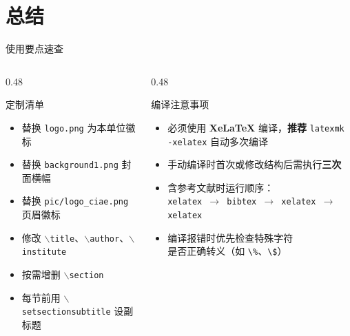 \documentclass[aspectratio=169]{beamer}
\def\cmd#1{\texttt{\color{red}\footnotesize $\backslash$#1}}
\begin{document}
\section{总结}

\begin{frame}{使用要点速查}
\begin{columns}[T]
\begin{column}{0.48\textwidth}
\begin{aim*}{定制清单}{}
\begin{itemize}[left=0pt,label=\textcolor{deepblue}{}]
    \item 替换 \texttt{logo.png} 为本单位徽标
    \item 替换 \texttt{background1.png} 封面横幅
    \item 替换 \texttt{pic/logo\_ciae.png} 页眉徽标
    \item 修改 \cmd{title}、\cmd{author}、\cmd{institute}
    \item 按需增删 \cmd{section}
    \item 每节前用 \cmd{setsectionsubtitle} 设副标题
\end{itemize}
\end{aim*}
\end{column}
\begin{column}{0.48\textwidth}
\begin{aim*}{编译注意事项}{}
\begin{itemize}[left=0pt,label=\textcolor{deepblue}{}]
    \item 必须使用 \textbf{XeLaTeX} 编译，\textbf{推荐} \texttt{latexmk -xelatex} 自动多次编译
    \item 手动编译时首次或修改结构后需执行\textbf{三次}
    \item 含参考文献时运行顺序：\\[0.3em]
    {\small\texttt{xelatex $\to$ bibtex $\to$ xelatex $\to$ xelatex}}
    \item 编译报错时优先检查特殊字符\\
    是否正确转义（如 \texttt{\textbackslash\%}、\texttt{\textbackslash\$}）
\end{itemize}
\end{aim*}
\end{column}
\end{columns}
\end{frame}

\makethankspage[请各位老师批评指正！]
\end{document}
